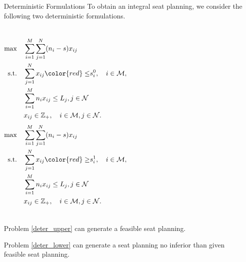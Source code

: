 \begin{frame}{Deterministic Formulations}  %
  To obtain an integral seat planning, we consider the following two deterministic formulations.
  \begin{columns}[c]  %
  \column{5cm}  %
  \scriptsize
  \begin{equation}\label{deter_upper}
    \begin{aligned}
    \max \quad & \sum_{i=1}^{M}  \sum_{j= 1}^{N} (n_i- s) x_{ij} \\
    \text {s.t.} \quad & \sum_{j= 1}^{N} x_{ij} {\color{red} \leq} s_{i}^{0}, \quad i \in \mathcal{M}, \\
    & \sum_{i=1}^{M} n_{i} x_{ij} \leq L_j, j \in \mathcal{N} \\
    & x_{ij} \in \mathbb{Z}_{+}, \quad i \in \mathcal{M}, j \in \mathcal{N}.
    \end{aligned}
  \end{equation}
  \column{5cm}
  \scriptsize
  \begin{equation}\label{deter_lower}
    \begin{aligned}
    \max \quad & \sum_{i=1}^{M}  \sum_{j= 1}^{N} (n_i- s) x_{ij} \\
    \text {s.t.} \quad & \sum_{j= 1}^{N} x_{ij} {\color{red} \geq} s_{i}^{1}, \quad i \in \mathcal{M}, \\
    & \sum_{i=1}^{M} n_{i} x_{ij} \leq L_j, j \in \mathcal{N} \\
    & x_{ij} \in \mathbb{Z}_{+}, \quad i \in \mathcal{M}, j \in \mathcal{N}.
    \end{aligned}
  \end{equation}
  \end{columns}  %
  Problem \eqref{deter_upper} can generate a feasible seat planning.

  Problem \eqref{deter_lower} can generate a seat planning no inferior than given feasible seat planning.
\end{frame}



